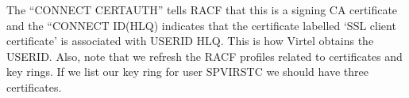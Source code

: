 \documentclass[letterpaper,10pt,english]{sphinxmanual}
\begin{document}
\sphinxAtStartPar
The “CONNECT CERTAUTH” tells RACF that this is a signing CA certificate and the “CONNECT ID(HLQ) indicates that the certificate labelled ‘SSL client certificate’ is associated with USERID HLQ. This is how Virtel obtains the USERID. Also, note that we refresh the RACF profiles related to certificates and key rings. If we list our key ring for user SPVIRSTC we should have three certificates.

\begin{sphinxVerbatim}[commandchars=\\\{\}]
  
     
                              
            
                               
                          
                         
\end{sphinxVerbatim}
\end{document}
